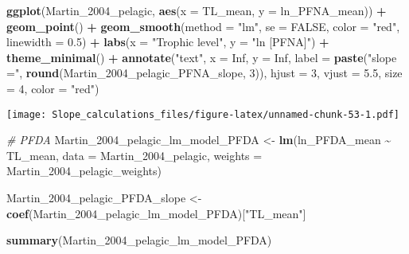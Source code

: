 \documentclass[
]{article}
\newenvironment{Shaded}{\begin{snugshade}}{\end{snugshade}}
\newcommand{\AttributeTok}[1]{\textcolor[rgb]{0.13,0.29,0.53}{#1}}
\newcommand{\CommentTok}[1]{\textcolor[rgb]{0.56,0.35,0.01}{\textit{#1}}}
\newcommand{\ConstantTok}[1]{\textcolor[rgb]{0.56,0.35,0.01}{#1}}
\newcommand{\DecValTok}[1]{\textcolor[rgb]{0.00,0.00,0.81}{#1}}
\newcommand{\FloatTok}[1]{\textcolor[rgb]{0.00,0.00,0.81}{#1}}
\newcommand{\FunctionTok}[1]{\textcolor[rgb]{0.13,0.29,0.53}{\textbf{#1}}}
\newcommand{\NormalTok}[1]{#1}
\newcommand{\OtherTok}[1]{\textcolor[rgb]{0.56,0.35,0.01}{#1}}
\newcommand{\SpecialCharTok}[1]{\textcolor[rgb]{0.81,0.36,0.00}{\textbf{#1}}}
\newcommand{\StringTok}[1]{\textcolor[rgb]{0.31,0.60,0.02}{#1}}
\begin{document}
\begin{Shaded}
\begin{Highlighting}[]
\FunctionTok{ggplot}\NormalTok{(Martin\_2004\_pelagic, }\FunctionTok{aes}\NormalTok{(}\AttributeTok{x =}\NormalTok{ TL\_mean, }\AttributeTok{y =}\NormalTok{ ln\_PFNA\_mean)) }\SpecialCharTok{+}
  \FunctionTok{geom\_point}\NormalTok{() }\SpecialCharTok{+}
  \FunctionTok{geom\_smooth}\NormalTok{(}\AttributeTok{method =} \StringTok{"lm"}\NormalTok{, }\AttributeTok{se =} \ConstantTok{FALSE}\NormalTok{, }\AttributeTok{color =} \StringTok{"red"}\NormalTok{, }\AttributeTok{linewidth =} \FloatTok{0.5}\NormalTok{) }\SpecialCharTok{+}
  \FunctionTok{labs}\NormalTok{(}\AttributeTok{x =} \StringTok{"Trophic level"}\NormalTok{,}
       \AttributeTok{y =} \StringTok{"ln [PFNA]"}\NormalTok{) }\SpecialCharTok{+}
  \FunctionTok{theme\_minimal}\NormalTok{() }\SpecialCharTok{+}
  \FunctionTok{annotate}\NormalTok{(}\StringTok{"text"}\NormalTok{, }\AttributeTok{x =} \ConstantTok{Inf}\NormalTok{, }\AttributeTok{y =} \ConstantTok{Inf}\NormalTok{, }\AttributeTok{label =} \FunctionTok{paste}\NormalTok{(}\StringTok{"slope ="}\NormalTok{, }\FunctionTok{round}\NormalTok{(Martin\_2004\_pelagic\_PFNA\_slope, }\DecValTok{3}\NormalTok{)), }
           \AttributeTok{hjust =} \DecValTok{3}\NormalTok{, }\AttributeTok{vjust =} \FloatTok{5.5}\NormalTok{, }\AttributeTok{size =} \DecValTok{4}\NormalTok{, }\AttributeTok{color =} \StringTok{"red"}\NormalTok{)}
\end{Highlighting}
\end{Shaded}

\texttt{[image: Slope\_calculations\_files/figure-latex/unnamed-chunk-53-1.pdf]}

\begin{Shaded}
\begin{Highlighting}[]
\CommentTok{\# PFDA}
\NormalTok{Martin\_2004\_pelagic\_lm\_model\_PFDA }\OtherTok{\textless{}{-}} \FunctionTok{lm}\NormalTok{(ln\_PFDA\_mean }\SpecialCharTok{\textasciitilde{}}\NormalTok{ TL\_mean, }
                                        \AttributeTok{data =}\NormalTok{ Martin\_2004\_pelagic,}
                                        \AttributeTok{weights =}\NormalTok{ Martin\_2004\_pelagic\_weights)}

\NormalTok{Martin\_2004\_pelagic\_PFDA\_slope }\OtherTok{\textless{}{-}} \FunctionTok{coef}\NormalTok{(Martin\_2004\_pelagic\_lm\_model\_PFDA)[}\StringTok{"TL\_mean"}\NormalTok{]}

\FunctionTok{summary}\NormalTok{(Martin\_2004\_pelagic\_lm\_model\_PFDA)}
\end{Highlighting}
\end{Shaded}
\end{document}
